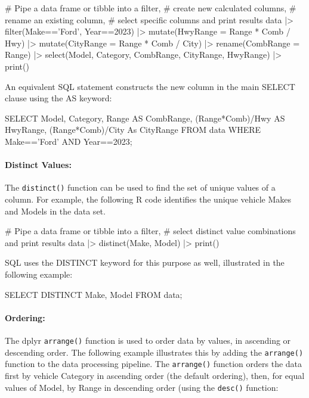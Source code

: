 \begin{samepage}
\begin{Rcode}
# Pipe a data frame or tibble into a filter,
# create new calculated columns,
# rename an existing column,
# select specific columns and print results
data |> 
  filter(Make=='Ford', Year==2023) |> 
  mutate(HwyRange = Range * Comb / Hwy) |>
  mutate(CityRange = Range * Comb / City) |>
  rename(CombRange = Range) |>
  select(Model, Category, CombRange, CityRange, HwyRange) |>
  print()
\end{Rcode}
\end{samepage}

An equivalent SQL statement constructs the new column in the main SELECT clause using the AS keyword:

\begin{samepage}
\begin{sqlcode}
SELECT Model, Category, 
      Range AS CombRange,
      (Range*Comb)/Hwy AS HwyRange, 
      (Range*Comb)/City As CityRange
   FROM data 
   WHERE Make=='Ford' AND Year==2023;
\end{sqlcode}
\end{samepage}

\paragraph*{Distinct Values:} The \texttt{distinct()} function can be used to find the set of unique values of a column. For example, the following R code identifies the unique vehicle Makes and Models in the data set. 

\begin{samepage}
\begin{Rcode}
# Pipe a data frame or tibble into a filter,
# select distinct value combinations and print results
data |> 
  distinct(Make, Model) |>
  print()
\end{Rcode}
\end{samepage}

SQL uses the DISTINCT keyword for this purpose as well, illustrated in the following example:

\begin{samepage}
\begin{sqlcode}
SELECT DISTINCT Make, Model 
  FROM data;
\end{sqlcode}
\end{samepage}

\paragraph*{Ordering:} The dplyr \texttt{arrange()} function is used to order data by values, in ascending or descending order. The following example illustrates this by adding the \texttt{arrange()} function to the data processing pipeline. The \texttt{arrange()} function orders the data first by vehicle Category in ascending order (the default ordering), then, for equal values of Model, by Range in descending order (using the \texttt{desc()} function:

